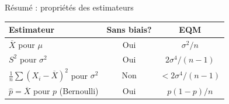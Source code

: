 \documentclass{BeamerTemplate}
\begin{document}
\begin{frame}[t]{Résumé : propriétés des estimateurs}

\begin{center}
\begin{tabular}{lcc}\hline
\textbf{Estimateur} & \textbf{Sans biais?} & \textbf{EQM} \\ \hline
$\overline{X}$ pour $\mu$ & Oui & $\sigma^2/n$ \\[4pt]
$S^2$ pour $\sigma^2$ & Oui & $2\sigma^4/(n-1)$ \\[4pt]
$\frac{1}{n}\sum(X_i-\overline{X})^2$ pour $\sigma^2$ & Non & $<2\sigma^4/(n-1)$ \\[4pt]
$\hat{p}=\overline{X}$ pour $p$ (Bernoulli) & Oui & $p(1-p)/n$ \\ \hline
\end{tabular}
\end{center}

\end{frame}
\end{document}
